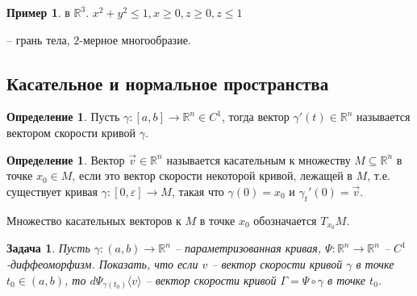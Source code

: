 \documentclass[a5paper]{article}
\newcounter{through}
\theoremstyle{plain}
\newtheorem{task}[through]{Задача}
\theoremstyle{definition}
\newtheorem{definition}[through]{Определение}
\newtheorem{example}[through]{Пример}
\numberwithin{through}{section}
\numberwithin{equation}{section}
\begin{document}
\begin{example}
	в $\mathbb{R}^3$. $x^2+y^2\leq 1, x\geq 0, z\geq 0, z\leq 1$
	
	\begin{center}
		

		
	\end{center}
-- грань тела, $2$-мерное многообразие.

\end{example}


\subsection{Касательное и нормальное пространства}

\begin{definition}
	Пусть $\gamma : [a, b] \to \mathbb{R}^n \in C^1$, тогда вектор $\gamma'(t) \in \mathbb{R}^n$ называется вектором скорости кривой $\gamma$.
\end{definition}

\begin{definition}
	Вектор $\vec{v} \in \mathbb{R}^n$ называется касательным к множеству 
	$M \subseteq \mathbb{R}^n$ в точке $x_0 \in M$, если это вектор скорости некоторой кривой, лежащей в $M$, т.е. существует кривая
	$\gamma : [0, \varepsilon] \to M$, такая что $\gamma(0) = x_0$ и $\gamma_t'(0) = \vec{v}$.
\end{definition}

Множество касательных векторов к $M$ в точке $x_0$ обозначается $T_{x_0}M$.

\begin{task}
	Пусть $\gamma : (a, b) \to \mathbb{R}^n$ -- параметризованная кривая, $\varPsi : \mathbb{R}^n \to \mathbb{R}^n$ -- $C^1$-диффеоморфизм. Показать, что если $v$ -- вектор скорости кривой $\gamma$ в точке $t_0 \in (a,b)$, то $d \varPsi_{\gamma(t_0)} \langle v \rangle$ -- вектор скорости кривой $\Gamma = \varPsi \circ \gamma$ в точке $t_0$.
\end{task}
\end{document}
